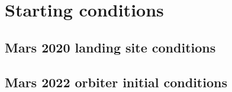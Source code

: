 \chapter{Starting conditions}
\label{ch:start-cond}



\section{Mars 2020 landing site conditions}
\label{sec:mars2020cond}



\section{Mars 2022 orbiter initial conditions}
\label{sec:mars2022cond}

